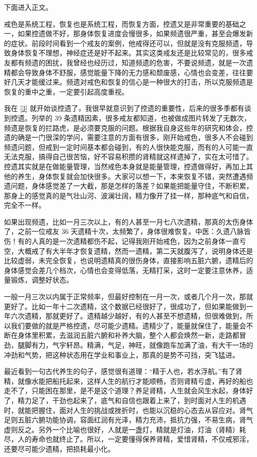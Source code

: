 下面进入正文。

戒色是系统工程，恢复也是系统工程，而恢复方面，控遗又是非常重要的基础之一，如果控遗做不好，那身体恢复进度会慢很多，如果频遗很严重，甚至会爆发新的症状。前段时间看到一个戒友的案例，他戒得还可以，但就是没有克服频遗，导致身体恢复不理想，神经症还是好不起来。其实这类戒友还是比较常见的，很多戒友都有频遗的困扰，我曾经也经历过，知道频遗的危害，不要说频遗，就是一次遗精都会导致身体不舒服，感觉能量下降的无力感和颓废感，心情也会变差，往往要好几天才能缓过来。频遗对戒色和恢复的信心是一种很大的打击，所以克服频遗是恢复的重中之重，一定要引起高度重视。

我在 \ref{3} 就开始谈控遗了，我很早就意识到了控遗的重要性，后来的很多季都有谈到控遗。列举的 39 条遗精因素，很多戒友都知道，也被做成图片转发了无数次，频遗是恢复的拦路虎，是必须要克服的问题。根据我自身这些年的研究和体会，控遗的确是一门很深的学问，需要注意的方面有很多，刚开始戒色，很多人不会碰到频遗问题，但戒到一定时间基本都会碰到，有的人很快能克服，而有的人可能一直无法克服，搞得自己很苦恼，好不容易积攒的肾精就这样遗掉了，实在太可惜了。控遗其实就是在做能量管理，当然戒色本身就是能量管理，控遗做得好，再加上其他的养生，身体恢复就会加快很多。大家可以想一下，本来恢复不错，突然遭遇频遗问题，身体感觉差了一大截，那是怎样的落差？如果能把能量守住，不断积累，那身上的感觉真的是气壮山河、波澜壮阔，精力像开了挂一样，那种底气和自信，完全不一样。

如果出现频遗，比如一月三次以上，有的人甚至一月七八次遗精，那真的太伤身体了，之前一位戒友 36 天遗精十次，太频繁了，身体很难恢复。中医：久遗八脉皆伤！有的人真的是一次遗精都伤不起，记得我刚开始戒色，因为之前身体一直亏空，大概戒了有大半年才恢复遗精，然而一遗精，第二天就腹泻了，说明身体还是比较虚弱，未完全恢复，也说明遗精真的很伤身体，直接影响五脏六腑，遗精后的身体感觉会差几个档次，心情也会变得低落，无精打采，这时一定要注意休养，适量锻炼，调整好状态。

一般一月三次以内属于正常频率，但最好控制在一月一次，或者几个月一次，那就更好了。比如一年十二次遗精，这个数据已经很好了，很成功了，但如果能做到一年六次遗精，那就更好了。遗精越少越好，有的人甚至不想遗精，但很难做到，所以我们要做的就是严格控遗，尽可能少遗精。遗精少了，能量就保住了，能量会不断在身体里积累，去滋润五脏六腑和补养大脑，整个人都会焕然一新，走路都冒劲，腿脚有力，气宇轩昂。精满，气足，神旺，就像跑车加满了油，有大干一场的冲劲和气势，把这种状态用在学业和事业上，那真的是势不可挡，突飞猛进。

最近看到一句古代养生的句子，感觉很有道理：“精于人也，若水浮航。”有了肾精，就像水能把船托起来，这样人生的航行才能顺畅，否则肾精亏虚，再好的船也走不了，只能困在那里，是不是这个道理？养足肾精，人生就会风生水起，身体好了，精力足了，干劲也起来了，底气和自信也跟着上来了，到时面对人生的机遇时，就能把握住，面对人生的挑战或挫折时，也能以沉稳的心态去从容应对。肾气足则五脏六腑功能协调，容面红润有光泽，精力充沛，抵抗力强，不易生病，肾气虚则反之。另外一个比喻也很好，人就是一盏灯，精就是灯油，灯油（肾精）耗尽，人的寿命也就终止了。所以，一定要懂得保养肾精，爱惜肾精，不仅戒邪淫，还要尽可能少遗精，把损耗最小化。

